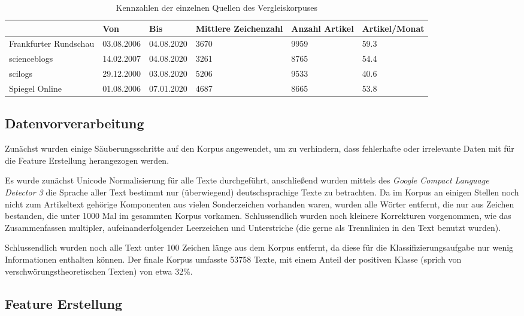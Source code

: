 \begin{table}
    \begin{center}
        \begin{tabularx}{\textwidth}{XXXXXX}
            \toprule
            & Von & Bis & Mittlere Zeichenzahl & Anzahl Artikel & Artikel/Monat\\
            \midrule
            Frankfurter Rundschau & 03.08.2006 & 04.08.2020 & 3670 & 9959 & 59.3\\
            scienceblogs & 14.02.2007 & 04.08.2020 & 3261 & 8765 & 54.4\\
            scilogs & 29.12.2000 & 03.08.2020 & 5206 & 9533 & 40.6\\
            Spiegel Online & 01.08.2006 & 07.01.2020 & 4687 & 8665 & 53.8\\
            \bottomrule
        \end{tabularx}
        \caption{Kennzahlen der einzelnen Quellen des Vergleiskorpuses}
        \label{comcorpus-stats}
    \end{center}
\end{table}

\subsection{Datenvorverarbeitung}

Zunächst wurden einige Säuberungsschritte auf den Korpus angewendet, um zu verhindern, dass fehlerhafte oder irrelevante Daten mit für die Feature Erstellung herangezogen werden.

Es wurde zunächst Unicode Normalisierung für alle Texte durchgeführt, anschließend wurden mittels des \textit{Google Compact Language Detector 3} \parencite[][]{cld3} die Sprache aller Text bestimmt nur (überwiegend) deutschsprachige Texte zu betrachten.
Da im Korpus an einigen Stellen noch nicht zum Artikeltext gehörige Komponenten aus vielen Sonderzeichen vorhanden waren, wurden alle Wörter entfernt, die nur aus Zeichen bestanden, die unter 1000 Mal im gesammten Korpus vorkamen.
Schlussendlich wurden noch kleinere Korrekturen vorgenommen, wie das Zusammenfassen multipler, aufeinanderfolgender Leerzeichen und Unterstriche (die gerne als Trennlinien in den Text benutzt wurden).

Schlussendlich wurden noch alle Text unter 100 Zeichen länge aus dem Korpus entfernt, da diese für die Klassifizierungsaufgabe nur wenig Informationen enthalten können. Der finale Korpus umfasste 53758 Texte, mit einem Anteil der positiven Klasse (sprich von verschwörungstheoretischen Texten) von etwa 32\%.

\subsection{Feature Erstellung}

